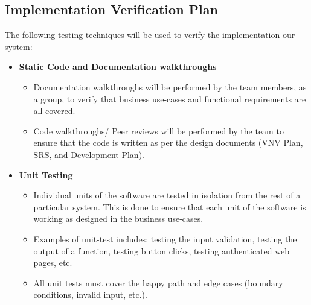 \documentclass[12pt, titlepage]{article}
\begin{document}
\subsection{Implementation Verification Plan}
The following testing techniques will be used to verify the implementation our system:
\begin{itemize}
  \item{\textbf{Static Code and Documentation walkthroughs}}
  \begin{itemize}
    \item{Documentation walkthroughs will be performed by the team members, as a group, to verify that business use-cases and functional requirements are all covered.}
    \item{Code walkthroughs/ Peer reviews will be performed by the team to ensure that the code is written as per the design documents (VNV Plan, SRS, and Development Plan).}
  \end{itemize}

  \item{\textbf{Unit Testing}}
  \begin{itemize}
    \item{Individual units of the software are tested in isolation from the rest of a particular system. This is done to ensure that each unit of the software is working as designed in the business use-cases.}
    \item{Examples of unit-test includes: testing the input validation, testing the output of a function, testing button clicks, testing authenticated web pages, etc.}
    \item{All unit tests must cover the happy path and edge cases (boundary conditions, invalid input, etc.).}
  \end{itemize}
  

\end{itemize}
\end{document}
